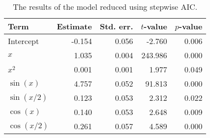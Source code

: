 \begin{table}[t]

\caption{\label{tab:stepwise-regression}The results of the model reduced using stepwise \ac{AIC}.}
\centering
\begin{tabular}{lrrrr}
\toprule
Term & Estimate & Std. err. & \(t\)-value & \(p\)-value\\
\midrule
Intercept & -0.154 & 0.056 & -2.760 & 0.006\\
\(x\) & 1.035 & 0.004 & 243.986 & 0.000\\
\(x^2\) & 0.001 & 0.001 & 1.977 & 0.049\\
\(\sin(x)\) & 4.757 & 0.052 & 91.813 & 0.000\\
\(\sin(x/2)\) & 0.123 & 0.053 & 2.312 & 0.022\\
\(\cos(x)\) & 0.140 & 0.053 & 2.648 & 0.009\\
\(\cos(x/2)\) & 0.261 & 0.057 & 4.589 & 0.000\\
\bottomrule
\end{tabular}
\end{table}